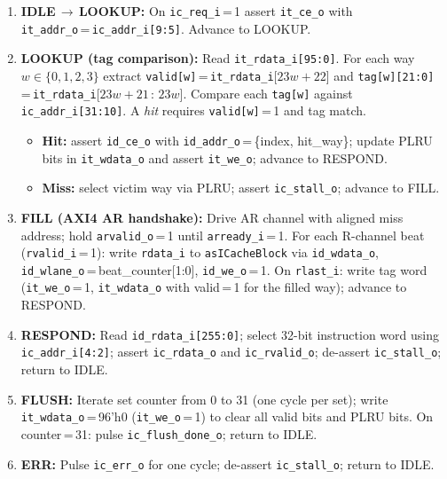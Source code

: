 \begin{enumerate}
  \item \textbf{IDLE\,$\to$\,LOOKUP:}
    On \texttt{ic\_req\_i}\,=\,1 assert \texttt{it\_ce\_o} with \\
    \texttt{it\_addr\_o}\,=\,\texttt{ic\_addr\_i[9:5]}.
    Advance to LOOKUP.

  \item \textbf{LOOKUP (tag comparison):}
    Read \texttt{it\_rdata\_i[95:0]}.
    For each way $w \in \{0,1,2,3\}$ extract
    \texttt{valid[w]}\,=\,\texttt{it\_rdata\_i}[$23w{+}22$] and
    \texttt{tag[w][21:0]}\,=\,\texttt{it\_rdata\_i}[$23w{+}21\,:\,23w$].
    Compare each \texttt{tag[w]} against \texttt{ic\_addr\_i[31:10]}.
    A \emph{hit} requires \texttt{valid[w]}\,=\,1 and tag match.
    \begin{itemize}
      \item \textbf{Hit:} assert \texttt{id\_ce\_o} with
        \texttt{id\_addr\_o}\,=\,\{index, hit\_way\};
        update PLRU bits in \texttt{it\_wdata\_o} and assert
        \texttt{it\_we\_o}; advance to RESPOND.
      \item \textbf{Miss:} select victim way via PLRU;
        assert \texttt{ic\_stall\_o}; advance to FILL.
    \end{itemize}

  \item \textbf{FILL (AXI4 AR handshake):}
    Drive AR channel with aligned miss address;
    hold \texttt{arvalid\_o}\,=\,1 until \texttt{arready\_i}\,=\,1.
    For each R-channel beat (\texttt{rvalid\_i}\,=\,1):
    write \texttt{rdata\_i} to \texttt{asICacheBlock} via
    \texttt{id\_wdata\_o}, \texttt{id\_wlane\_o}\,=\,beat\_counter[1:0],
    \texttt{id\_we\_o}\,=\,1.
    On \texttt{rlast\_i}: write tag word (\texttt{it\_we\_o}\,=\,1,
    \texttt{it\_wdata\_o} with valid\,=\,1 for the filled way);
    advance to RESPOND.

  \item \textbf{RESPOND:}
    Read \texttt{id\_rdata\_i[255:0]};
    select 32-bit instruction word using \texttt{ic\_addr\_i[4:2]};
    assert \texttt{ic\_rdata\_o} and \texttt{ic\_rvalid\_o};
    de-assert \texttt{ic\_stall\_o}; return to IDLE.

  \item \textbf{FLUSH:}
    Iterate set counter from 0 to 31 (one cycle per set);
    write \texttt{it\_wdata\_o}\,=\,96'h0 (\texttt{it\_we\_o}\,=\,1)
    to clear all valid bits and PLRU bits.
    On counter\,=\,31: pulse \texttt{ic\_flush\_done\_o}; return to IDLE.

  \item \textbf{ERR:}
    Pulse \texttt{ic\_err\_o} for one cycle; de-assert
    \texttt{ic\_stall\_o}; return to IDLE.
\end{enumerate}

